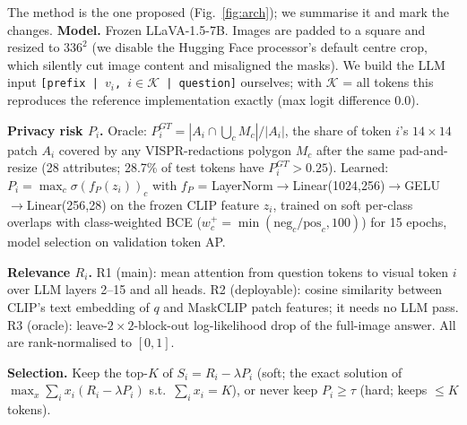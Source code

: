 \documentclass[10pt]{article}
\newcommand{\R}{R}
\renewcommand{\Pr}{P}
\begin{document}
The method is the one proposed (Fig.~\ref{fig:arch}); we summarise it and mark the changes.
\textbf{Model.} Frozen LLaVA-1.5-7B. Images are padded to a square and resized to $336^2$ (we disable the Hugging Face processor's default centre crop, which silently cut image content and misaligned the masks).
We build the LLM input \texttt{[prefix | $v_i$, $i\in\mathcal K$ | question]} ourselves; with $\mathcal K$ = all tokens this reproduces the reference implementation exactly (max logit difference 0.0).

\textbf{Privacy risk $\Pr_i$.} Oracle: $\Pr^{GT}_i=|A_i\cap\bigcup_c M_c|/|A_i|$, the share of token $i$'s $14{\times}14$ patch $A_i$ covered by any VISPR-redactions polygon $M_c$ after the same pad-and-resize
(28 attributes; 28.7\% of test tokens have $\Pr^{GT}_i>0.25$). Learned: $\Pr_i=\max_c\sigma(f_P(z_i))_c$ with $f_P$ = LayerNorm$\to$Linear(1024,256)$\to$GELU$\to$Linear(256,28) on the frozen CLIP feature $z_i$,
trained on soft per-class overlaps with class-weighted BCE ($w^+_c=\min(\text{neg}_c/\text{pos}_c,100)$) for 15 epochs, model selection on validation token AP.

\textbf{Relevance $\R_i$.} R1 (main): mean attention from question tokens to visual token $i$ over LLM layers 2--15 and all heads. R2 (deployable): cosine similarity between CLIP's text embedding of $q$ and MaskCLIP patch features; it needs no LLM pass.
R3 (oracle): leave-$2{\times}2$-block-out log-likelihood drop of the full-image answer. All are rank-normalised to $[0,1]$.

\textbf{Selection.} Keep the top-$K$ of $S_i=\R_i-\lambda\Pr_i$ (soft; the exact solution of $\max_x\sum_i x_i(\R_i-\lambda\Pr_i)$ s.t.\ $\sum_i x_i=K$),
or never keep $\Pr_i\ge\tau$ (hard; keeps $\le K$ tokens).
\end{document}

